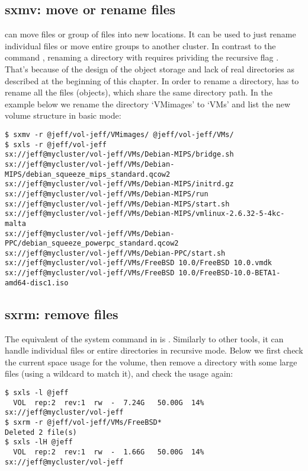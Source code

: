 \subsection{sxmv: move or rename files}
 can move files or group of files into new locations. It can be
used to just rename individual files or move entire groups to another cluster.
In contrast to the command , renaming a directory with 
requires prividing the recursive flag . That's because of the design
of the object storage and lack of real directories as described at the beginning
of this chapter. In order to rename a directory,  has to rename all the
files (objects), which share the same directory path. In the example below we rename
the directory `VMimages' to `VMs' and list the new volume structure in basic mode:
\begin{lstlisting}
$ sxmv -r @jeff/vol-jeff/VMimages/ @jeff/vol-jeff/VMs/
$ sxls -r @jeff/vol-jeff
sx://jeff@mycluster/vol-jeff/VMs/Debian-MIPS/bridge.sh
sx://jeff@mycluster/vol-jeff/VMs/Debian-MIPS/debian_squeeze_mips_standard.qcow2
sx://jeff@mycluster/vol-jeff/VMs/Debian-MIPS/initrd.gz
sx://jeff@mycluster/vol-jeff/VMs/Debian-MIPS/run
sx://jeff@mycluster/vol-jeff/VMs/Debian-MIPS/start.sh
sx://jeff@mycluster/vol-jeff/VMs/Debian-MIPS/vmlinux-2.6.32-5-4kc-malta
sx://jeff@mycluster/vol-jeff/VMs/Debian-PPC/debian_squeeze_powerpc_standard.qcow2
sx://jeff@mycluster/vol-jeff/VMs/Debian-PPC/start.sh
sx://jeff@mycluster/vol-jeff/VMs/FreeBSD 10.0/FreeBSD 10.0.vmdk
sx://jeff@mycluster/vol-jeff/VMs/FreeBSD 10.0/FreeBSD-10.0-BETA1-amd64-disc1.iso
\end{lstlisting}

\subsection{sxrm: remove files}
The equivalent of the system command  in \SX is . Similarly
to other tools, it can handle individual files or entire directories in
recursive mode. Below we first check the current space usage for the volume, then
remove a directory with some large files (using a wildcard to match it), and check
the usage again:
\begin{lstlisting}
$ sxls -l @jeff
  VOL  rep:2  rev:1  rw  -  7.24G   50.00G  14% sx://jeff@mycluster/vol-jeff
$ sxrm -r @jeff/vol-jeff/VMs/FreeBSD*
Deleted 2 file(s)
$ sxls -lH @jeff
  VOL  rep:2  rev:1  rw  -  1.66G   50.00G  14% sx://jeff@mycluster/vol-jeff
\end{lstlisting}

